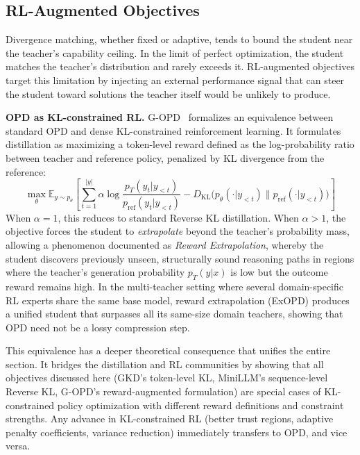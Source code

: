 \documentclass{article} %
\newcommand{\E}{\mathbb{E}}
\newcommand{\KL}{D_{\mathrm{KL}}}
\newcommand{\ptheta}{p_\theta}
\newcommand{\pteacher}{p_T}
\begin{document}
\subsection{RL-Augmented Objectives}
\label{subsec:rl_objectives}

Divergence matching, whether fixed or adaptive, tends to bound the student near the teacher's capability ceiling. In the limit of perfect optimization, the student matches the teacher's distribution and rarely exceeds it. RL-augmented objectives target this limitation by injecting an external performance signal that can steer the student toward solutions the teacher itself would be unlikely to produce.

\textbf{OPD as KL-constrained RL.} G-OPD~\citep{2602.12125} formalizes an equivalence between standard OPD and dense KL-constrained reinforcement learning. It formulates distillation as maximizing a token-level reward defined as the log-probability ratio between teacher and reference policy, penalized by KL divergence from the reference:
\begin{equation}
    \max_\theta \E_{y \sim \ptheta} \left[ \sum_{t=1}^{|y|} \alpha \log \frac{\pteacher(y_t | y_{<t})}{p_{\text{ref}}(y_t | y_{<t})} - \KL\big(\ptheta(\cdot | y_{<t}) \parallel p_{\text{ref}}(\cdot | y_{<t})\big) \right]
\end{equation}
When $\alpha = 1$, this reduces to standard Reverse KL distillation. When $\alpha > 1$, the objective forces the student to \emph{extrapolate} beyond the teacher's probability mass, allowing a phenomenon documented as \emph{Reward Extrapolation}, whereby the student discovers previously unseen, structurally sound reasoning paths in regions where the teacher's generation probability $\pteacher(y|x)$ is low but the outcome reward remains high. In the multi-teacher setting where several domain-specific RL experts share the same base model, reward extrapolation (ExOPD) produces a unified student that surpasses all its same-size domain teachers, showing that OPD need not be a lossy compression step.

This equivalence has a deeper theoretical consequence that unifies the entire section. It bridges the distillation and RL communities by showing that all objectives discussed here (GKD's token-level KL, MiniLLM's sequence-level Reverse KL, G-OPD's reward-augmented formulation) are special cases of KL-constrained policy optimization with different reward definitions and constraint strengths. Any advance in KL-constrained RL (better trust regions, adaptive penalty coefficients, variance reduction) immediately transfers to OPD, and vice versa.
\end{document}

